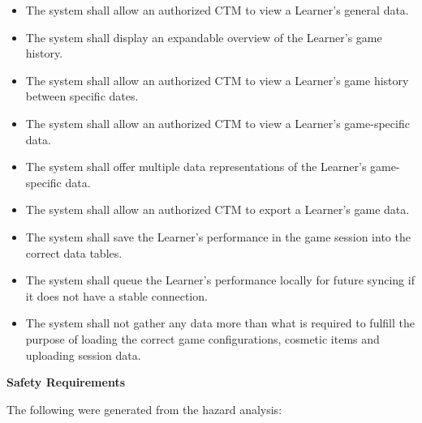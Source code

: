 \documentclass[12pt]{article}
\newcounter{reqnumL} %
\newcounter{reqnumLD} %
\begin{document}
\noindent \begin{itemize}
  \setcounter{reqnumLD}{0}

  \item[\refstepcounter{reqnumLD}\thereqnumLD \label{FR-DATA-1}:] The system shall allow an authorized CTM to view a Learner's general data.

  \item[\refstepcounter{reqnumLD}\thereqnumLD \label{FR-DATA-2}:] The system shall display an expandable overview of the Learner's game history.

  \item[\refstepcounter{reqnumLD}\thereqnumLD \label{FR-DATA-3}:] The system shall allow an authorized CTM to view a Learner's game history between specific dates.

  \item[\refstepcounter{reqnumLD}\thereqnumLD \label{FR-DATA-4}:] The system shall allow an authorized CTM to view a Learner's game-specific data.

  \item[\refstepcounter{reqnumLD}\thereqnumLD \label{FR-DATA-5}:] The system shall offer multiple data representations of the Learner's game-specific data.

  \item[\refstepcounter{reqnumLD}\thereqnumLD \label{FR-DATA-6}:] The system shall allow an authorized CTM to export a Learner's game data.

  \item[\refstepcounter{reqnumLD}\thereqnumLD \label{FR-DATA-7}:] The system shall save the Learner's performance in the game session into the correct data tables.

  \item[\refstepcounter{reqnumLD}\thereqnumLD \label{FR-DATA-8}:] The system shall queue the Learner's performance locally for future syncing if it does not have a stable connection.

  \item[\refstepcounter{reqnumLD}\thereqnumLD \label{FR-DATA-9}:] The system shall not gather any data more than what is required to fulfill the purpose of loading the correct game configurations, cosmetic items and uploading session data.

\end{itemize}

\textbf{Safety Requirements}

The following were generated from the hazard analysis:
\end{document}
